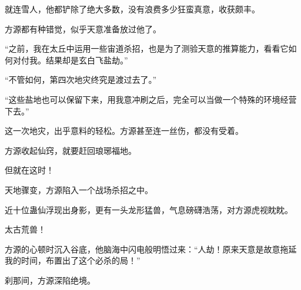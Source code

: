 \begin{this_body}
就连雪人，他都铲除了绝大多数，没有浪费多少狂蛮真意，收获颇丰。

方源都有种错觉，似乎天意准备放过他了。

“之前，我在太丘中运用一些宙道杀招，也是为了测验天意的推算能力，看看它如何对付我。结果却是玄白飞盐劫。”

“不管如何，第四次地灾终究是渡过去了。”

“这些盐地也可以保留下来，用我意冲刷之后，完全可以当做一个特殊的环境经营下去。”

这一次地灾，出乎意料的轻松。方源甚至连一丝伤，都没有受着。

方源收起仙窍，就要赶回琅琊福地。

但就在这时！

天地骤变，方源陷入一个战场杀招之中。

近十位蛊仙浮现出身影，更有一头龙形猛兽，气息磅礴浩荡，对方源虎视眈眈。

太古荒兽！

方源的心顿时沉入谷底，他脑海中闪电般明悟过来：“人劫！原来天意是故意拖延我的时间，布置出了这个必杀的局！”

刹那间，方源深陷绝境。

\end{this_body}

